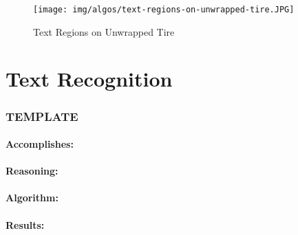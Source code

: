 \begin{figure}
    \centering
    \texttt{[image: img/algos/text-regions-on-unwrapped-tire.JPG]}
    \caption{Text Regions on Unwrapped Tire}
    \label{fig:text-regions-on-unwrapped-tire}
\end{figure}

\section{Text Recognition}\label{sec:text-recognition}



\subsubsection{TEMPLATE}
\label{subsubsec:TEMPLATE}

\paragraph*{Accomplishes:}\mbox{}\par

\paragraph*{Reasoning:}\mbox{}\par

\paragraph*{Algorithm:}\mbox{}\par

\paragraph*{Results:}\mbox{}\par
